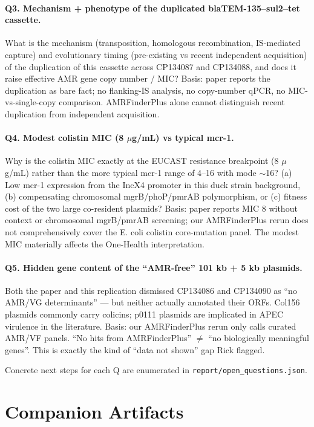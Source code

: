 \documentclass[11pt]{article}
\begin{document}
\paragraph{Q3. Mechanism + phenotype of the duplicated blaTEM-135--sul2--tet cassette.} What is
the mechanism (transposition, homologous recombination, IS-mediated capture) and evolutionary
timing (pre-existing vs recent independent acquisition) of the duplication of this cassette across
CP134087 and CP134088, and does it raise effective AMR gene copy number / MIC? Basis: paper reports
the duplication as bare fact; no flanking-IS analysis, no copy-number qPCR, no MIC-vs-single-copy
comparison. AMRFinderPlus alone cannot distinguish recent duplication from independent acquisition.

\paragraph{Q4. Modest colistin MIC (8 $\mu$g/mL) vs typical mcr-1.} Why is the colistin MIC
exactly at the EUCAST resistance breakpoint (8 $\mu$g/mL) rather than the more typical mcr-1 range
of 4--16 with mode $\sim$16? (a) Low mcr-1 expression from the IncX4 promoter in this duck strain
background, (b) compensating chromosomal mgrB/phoP/pmrAB polymorphism, or (c) fitness cost of the
two large co-resident plasmids? Basis: paper reports MIC 8 without context or chromosomal
mgrB/pmrAB screening; our AMRFinderPlus rerun does not comprehensively cover the E. coli colistin
core-mutation panel. The modest MIC materially affects the One-Health interpretation.

\paragraph{Q5. Hidden gene content of the ``AMR-free'' 101 kb + 5 kb plasmids.} Both the paper
and this replication dismissed CP134086 and CP134090 as ``no AMR/VG determinants'' --- but
neither actually annotated their ORFs. Col156 plasmids commonly carry colicins; p0111 plasmids
are implicated in APEC virulence in the literature. Basis: our AMRFinderPlus rerun only calls
curated AMR/VF panels. ``No hits from AMRFinderPlus'' $\neq$ ``no biologically meaningful genes''.
This is exactly the kind of ``data not shown'' gap Rick flagged.

Concrete next steps for each Q are enumerated in \texttt{report/open\_questions.json}.

\section{Companion Artifacts}
\label{sec:companion}
\end{document}
